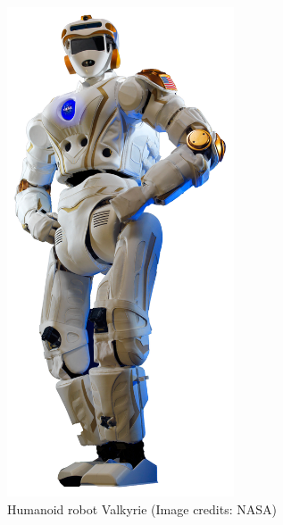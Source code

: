 \begin{figure}
\begin{minipage}{0.5\textwidth}
\centering
\includegraphics[width=0.6\textwidth]{images/valkyrie/Valkyrie.jpg}
\caption[Valkyrie]{Humanoid robot Valkyrie (Image credits: NASA)}
\label{fig:valkyrie}
\end{minipage}
%
\hspace{0.5cm}
%
\begin{minipage}{0.5\textwidth}
\centering
{}


\end{minipage}
\end{figure}
